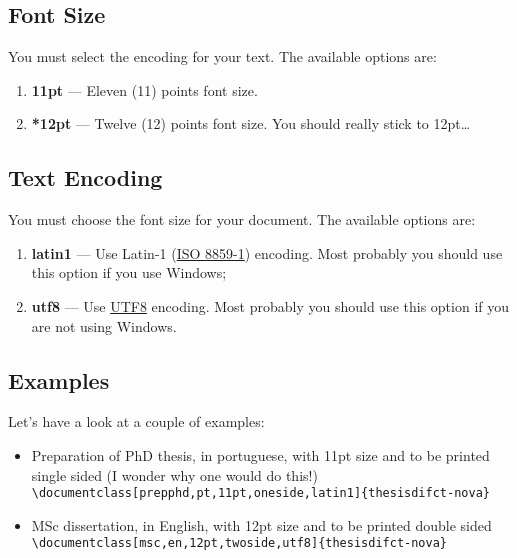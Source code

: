 \subsection{Font Size}
\label{ssec:font_size}

You must select the encoding for your text. The available options are:
\begin{enumerate}
	\item \textbf{11pt} --- Eleven (11) points font size.
	\item \textbf{*12pt} --- Twelve (12) points font size. You should really stick to 12pt\ldots
\end{enumerate}

\subsection{Text Encoding}
\label{ssec:text_encoding}

You must choose the font size for your document. The available options are:
\begin{enumerate}
	\item \textbf{latin1} --- Use Latin-1 (\href{http://en.wikipedia.org/wiki/ISO/IEC_8859-1}{ISO 8859-1}) encoding.  Most probably you should use this option if you use Windows;
	\item \textbf{utf8} --- Use \href{http://en.wikipedia.org/wiki/UTF-8}{UTF8} encoding.    Most probably you should use this option if you are not using Windows.
\end{enumerate}

\subsection{Examples}
\label{ssec:examples}

Let's have a look at a couple of examples:

\begin{itemize}
	\item Preparation of PhD thesis, in portuguese, with 11pt size and to be printed single sided (I wonder why one would do this!)\\
	\verb!\documentclass[prepphd,pt,11pt,oneside,latin1]{thesisdifct-nova}!
	\item MSc dissertation, in English, with 12pt size and to be printed double sided\\
	\verb!\documentclass[msc,en,12pt,twoside,utf8]{thesisdifct-nova}!
\end{itemize}

